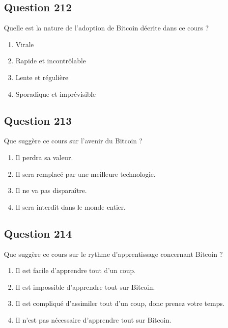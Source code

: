 \documentclass[12pt,a4paper]{article}
\begin{document}
\bigskip


\subsection*{Question 212}
Quelle est la nature de l'adoption de Bitcoin décrite dans ce cours ?

\begin{enumerate}[label=\Alph*., leftmargin=*]
\item Virale
\item Rapide et incontrôlable
\item Lente et régulière
\item Sporadique et imprévisible
\end{enumerate}

\bigskip


\subsection*{Question 213}
Que suggère ce cours sur l'avenir du Bitcoin ?

\begin{enumerate}[label=\Alph*., leftmargin=*]
\item Il perdra sa valeur.
\item Il sera remplacé par une meilleure technologie.
\item Il ne va pas disparaître.
\item Il sera interdit dans le monde entier.
\end{enumerate}

\bigskip


\subsection*{Question 214}
Que suggère ce cours sur le rythme d'apprentissage concernant Bitcoin ?

\begin{enumerate}[label=\Alph*., leftmargin=*]
\item Il est facile d'apprendre tout d'un coup.
\item Il est impossible d'apprendre tout sur Bitcoin.
\item Il est compliqué d'assimiler tout d'un coup, donc prenez votre temps.
\item Il n'est pas nécessaire d'apprendre tout sur Bitcoin.
\end{enumerate}

\bigskip
\end{document}

